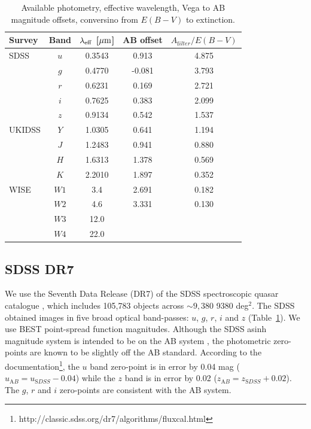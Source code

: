 \begin{table}
  \small
  \centering
  \begin{tabular}{lcccc}
    \hline 
    Survey & Band & $\lambda_{\rm eff}$ [$\mu{\rm m}$] & AB offset & $A_{\mathrm filter}/E(B-V)$ \\
    \hline 
    SDSS & $u$ & 0.3543 &  0.913 & 4.875 \\
         & $g$ & 0.4770 & -0.081 & 3.793 \\
         & $r$ & 0.6231 &  0.169 & 2.721 \\
         & $i$ & 0.7625 &  0.383 & 2.099 \\
         & $z$ & 0.9134 &  0.542 & 1.537 \\
    UKIDSS & $Y$ & 1.0305 &  0.641 & 1.194 \\
           & $J$ & 1.2483 &  0.941 & 0.880 \\
           & $H$ & 1.6313 &  1.378 & 0.569 \\
           & $K$ & 2.2010 &  1.897 & 0.352 \\
    WISE & $W1$ & 3.4 & 2.691 & 0.182\\
         & $W2$ & 4.6 & 3.331 & 0.130\\
         & $W3$ & 12.0 & & \\
         & $W4$ & 22.0 & & \\           
    \hline
  \end{tabular}
  \caption[{Available photometry, effective wavelength, Vega to AB magnitude offsets, conversion from $E(B-V)$ to extinction.}]{Available photometry, effective wavelength, Vega to AB magnitude offsets, conversino from $E(B-V)$ to extinction. }
  \label{tab:photometry}
\end{table}

\subsection{SDSS DR7}

We use the Seventh Data Release (DR7) of the SDSS spectroscopic quasar catalogue \citep{schneider10}, which includes 105,783 objects across $\sim 9,380$ 9380 deg$^2$. 
The SDSS obtained images in five broad optical band-passes: $u$, $g$, $r$, $i$ and $z$ (Table~\ref{tab:photometry}).  
We use BEST point-spread function magnitudes.
Although the SDSS asinh magnitude system is intended to be on the AB system \citep{oke83}, the photometric zero-points are known to be slightly off the AB standard. 
According to the documentation\footnote{http://classic.sdss.org/dr7/algorithms/fluxcal.html}, the $u$ band zero-point is in error by 0.04 mag ($u_{\mathrm AB} = u_{\mathrm SDSS} - 0.04$) while the $z$ band is in error by 0.02 ($z_{\mathrm AB} = z_{\mathrm SDSS} + 0.02$). 
The $g$, $r$ and $i$ zero-points are consistent with the AB system. 

